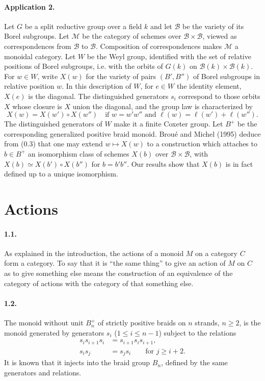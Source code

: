 \documentclass[11pt]{article}
\newcommand{\calB}{\mathcal B}
\newcommand{\calM}{\mathcal M}
\begin{document}
\paragraph{Application 2.} Let $G$ be a split reductive group over a field $k$ and let $\calB$ be the variety of its Borel subgroups. Let $\calM$ be the category of schemes over $\calB\times\calB$, viewed as correspondences from $\calB$ to $\calB$. Composition of correspondences makes $\calM$ a monoidal category. Let $W$ be the Weyl group, identified with the set of relative positions of Borel subgroups, i.e. with the orbits of $G(k)$ on $\calB(k)\times\calB(k)$. For $w\in W$, write $X(w)$ for the variety of pairs $(B',B'')$ of Borel subgroups in relative position $w$. In this description of $W$, for $e\in W$ the identity element, $X(e)$ is the diagonal. The distinguished generators $s_i$ correspond to those orbits $X$ whose closure is $X$ union the diagonal, and the group law is characterized by
\begin{equation}
 X(w)=X(w')\circ X(w'')
\quad\text{if }w=w'w''\text{ and }\ell(w)=\ell(w')+\ell(w'').
\tag{0.3}
\end{equation}
The distinguished generators of $W$ make it a finite Coxeter group. Let $B^+$ be the corresponding generalized positive braid monoid. Brou\'e and Michel (1995) deduce from (0.3) that one may extend $w\mapsto X(w)$ to a construction which attaches to $b\in B^+$ an isomorphism class of schemes $X(b)$ over $\calB\times\calB$, with $X(b)\simeq X(b')\circ X(b'')$ for $b=b'b''$. Our results show that $X(b)$ is in fact defined up to a unique isomorphism.

\section{Actions}
\paragraph{1.1.} As explained in the introduction, the actions of a monoid $M$ on a category $C$ form a category. To say that it is ``the same thing'' to give an action of $M$ on $C$ as to give something else means the construction of an equivalence of the category of actions with the category of that something else.

\paragraph{1.2.} The monoid without unit $B_n^+$ of strictly positive braids on $n$ strands, $n\geq 2$, is the monoid generated by generators $s_i$ ($1\leq i\leq n-1$) subject to the relations
\begin{align}
 s_i s_{i+1}s_i &= s_{i+1}s_i s_{i+1}, \tag{1.2.1}\\
 s_i s_j &= s_j s_i \qquad\text{for }j\geq i+2.
\end{align}
It is known that it injects into the braid group $B_n$, defined by the same generators and relations.
\end{document}
